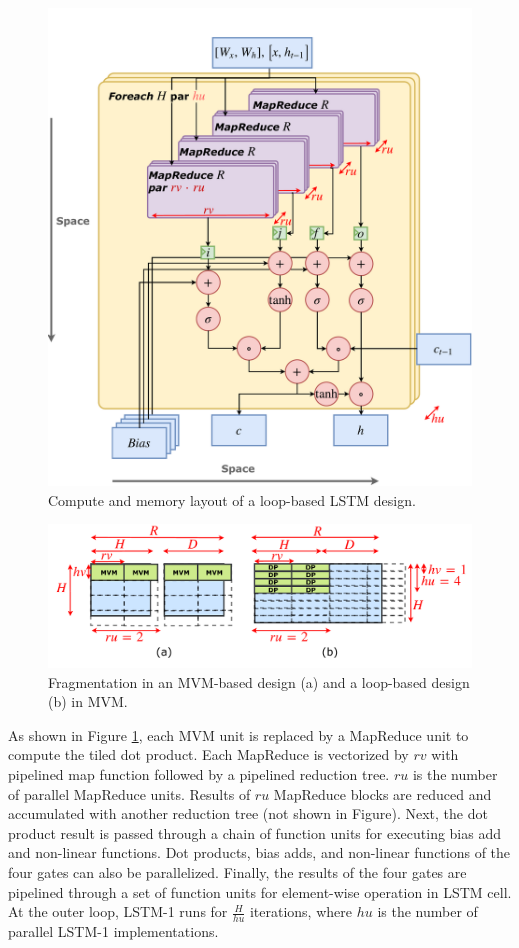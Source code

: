 \begin{figure}
 \centering
  \includegraphics[width=0.9\columnwidth]{figs/splstm.pdf}
  \caption{Compute and memory layout of a loop-based LSTM design.}\label{fig:spatial_lstm}
  \vspace*{-0.2in}
\end{figure}
\begin{figure}
  \centering
  \includegraphics[width=\columnwidth]{figs/bwfrag.pdf}
   \caption{Fragmentation in an MVM-based design (a) and a loop-based design (b) in MVM.}\label{fig:bwt}
\end{figure}

As shown in Figure \ref{fig:spatial_lstm}, each MVM unit is replaced by a MapReduce unit to 
compute the tiled dot product.
Each MapReduce is vectorized by $rv$ with pipelined map function followed by a pipelined reduction tree.
$ru$ is the number of parallel MapReduce units. Results of $ru$ MapReduce blocks are reduced and 
accumulated with another reduction tree (not shown in Figure). Next, the dot product result is passed 
through a chain of function units for executing bias add and non-linear functions. Dot products, bias adds, 
and non-linear functions of the four gates can also be parallelized. Finally, the results of the four gates are pipelined
through a set of function units for element-wise operation in LSTM cell.
At the outer loop, LSTM-1 runs for $\frac{H}{hu}$ iterations,
  where $hu$ is the number of parallel LSTM-1 implementations.

